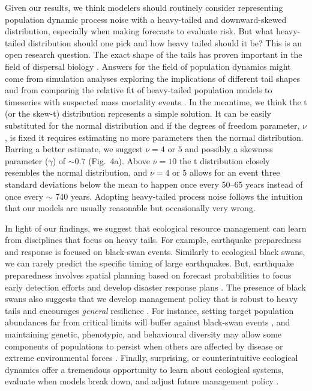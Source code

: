 Given our results, we think modelers should routinely consider representing population dynamic
process noise with a heavy-tailed and downward-skewed distribution,
especially when making forecasts to evaluate risk.
But what heavy-tailed distribution should one pick
and how heavy tailed should it be?
This is an open research question.
The exact shape of the tails has proven important
in the field of dispersal biology \citep{kot1996, clark1999}.
Answers for the field of population dynamics
might come from simulation analyses exploring
the implications of different tail shapes and
from comparing the relative fit of heavy-tailed
population models to timeseries
with suspected mass mortality events
\citep[e.g.~the t distribution compared to a mixture
of two normal distributions;][]{ward2007}.
In the meantime, we think the t (or the skew-t) distribution
represents a simple solution.
It can be easily substituted for the normal distribution
and if the degrees of freedom parameter, $\nu$,
is fixed
it requires estimating no more parameters
then the normal distribution.
Barring a better estimate, we suggest $\nu = 4$ or $5$ and possibly a skewness parameter ($\gamma$) of $\sim 0.7$ (Fig.~4a).
Above $\nu  =  10$ the t distribution closely resembles
the normal distribution,
and $\nu  = 4$ or $5$ allows for an event
three standard deviations below the mean to happen
once every 50--65 years instead of once every $\sim$ 740 years.
Adopting heavy-tailed process noise follows the intuition
that our models are usually reasonable but occasionally very wrong.

In light of our findings, we suggest that ecological resource management can
learn from disciplines that focus on heavy tails. For example, earthquake
preparedness and response is focused on black-swan events. Similarly to
ecological black swans, we can rarely predict the specific timing of large
earthquakes. But, earthquake preparedness involves spatial planning based on
forecast probabilities to focus early detection efforts and develop disaster
response plans \citep{nrc2007}. The presence of black swans also suggests that we
develop management policy that is robust to heavy tails and encourages
\textit{general} resilience \citep{carpenter2012}. For instance, setting target
population abundances far from critical limits will buffer against black-swan
events \citep{caddy1996}, and maintaining genetic, phenotypic, and behavioural
diversity may allow some components of populations to persist when others are
affected by disease or extreme environmental forces \citep{schindler2010}.
Finally, surprising, or counterintuitive ecological dynamics offer a tremendous
opportunity to learn about ecological systems, evaluate when models break down,
and adjust future management policy \citep{doak2008, lindenmayer2010}.

